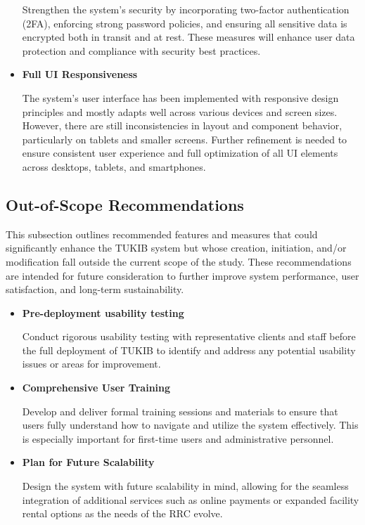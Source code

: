 \begin{itemize}
Strengthen the system’s security by incorporating two-factor authentication (2FA), enforcing strong password policies, and ensuring all sensitive data is encrypted both in transit and at rest. These measures will enhance user data protection and compliance with security best practices.

\item \textbf{Full UI Responsiveness}

The system’s user interface has been implemented with responsive design principles and mostly adapts well across various devices and screen sizes. However, there are still inconsistencies in layout and component behavior, particularly on tablets and smaller screens. Further refinement is needed to ensure consistent user experience and full optimization of all UI elements across desktops, tablets, and smartphones.

\end{itemize}

\subsection{Out-of-Scope Recommendations}

This subsection outlines recommended features and measures that could significantly enhance the TUKIB system but whose creation, initiation, and/or modification fall outside the current scope of the study. These recommendations are intended for future consideration to further improve system performance, user satisfaction, and long-term sustainability.

\begin{itemize}
	
\item \textbf{Pre-deployment usability testing}

Conduct rigorous usability testing with representative clients and staff before the full deployment of TUKIB to identify and address any potential usability issues or areas for improvement.

\item \textbf{Comprehensive User Training}

Develop and deliver formal training sessions and materials to ensure that users fully understand how to navigate and utilize the system effectively. This is especially important for first-time users and administrative personnel.

\item \textbf{Plan for Future Scalability}

Design the system with future scalability in mind, allowing for the seamless integration of additional services such as online payments or expanded facility rental options as the needs of the RRC evolve.

\end{itemize}


